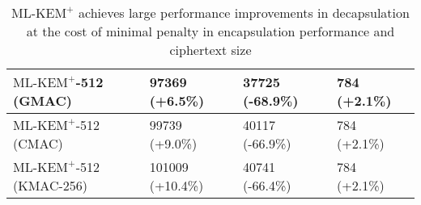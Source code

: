 \documentclass[journal=tches,submission]{iacrtrans}
\def\mlkemplus{\text{ML-KEM}^+}
\begin{document}
\begin{table}[h]
\begin{tabular}{|p{2.5cm}|p{1.4cm}|p{1.4cm}|p{1.4cm}|}
       $\mlkemplus$-512 \newline (GMAC)
       & 97369 \newline (+6.5\%)
       & 37725 \newline (-68.9\%)
       & 784 \newline (+2.1\%) \\
       \hline
       $\mlkemplus$-512 \newline (CMAC)
       & 99739 \newline (+9.0\%)
       & 40117 \newline (-66.9\%)
       & 784 \newline (+2.1\%) \\
       \hline
       $\mlkemplus$-512 \newline (KMAC-256)
       & 101009 \newline (+10.4\%)
       & 40741 \newline (-66.4\%)
       & 784 \newline (+2.1\%) \\
       \hline
    \end{tabular}

    \caption{$\mlkemplus$ achieves large performance improvements in decapsulation at the cost of minimal penalty in encapsulation performance and ciphertext size}\label{tbl:cpu-cycles-summary}
\end{table}
\end{document}
